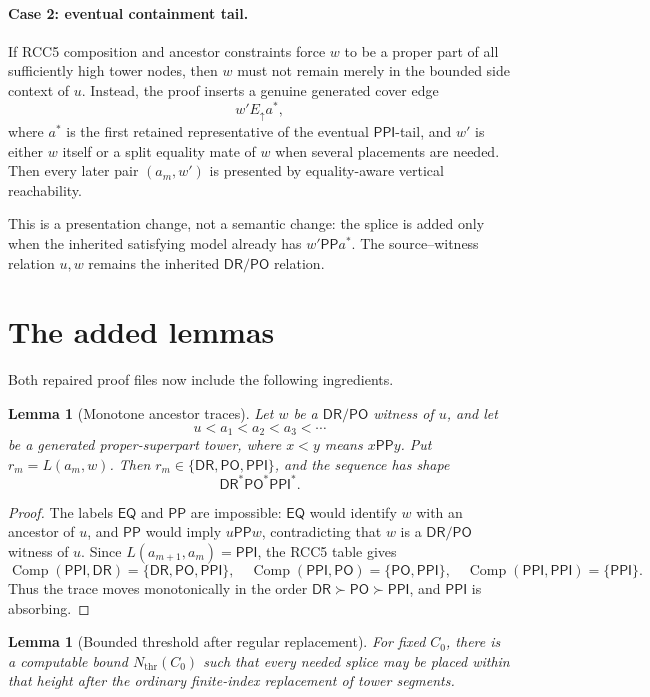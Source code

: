 \documentclass[11pt]{article}
\newtheorem{lemma}[theorem]{Lemma}
\newcommand{\EQ}{\mathsf{EQ}}
\newcommand{\DR}{\mathsf{DR}}
\newcommand{\PO}{\mathsf{PO}}
\newcommand{\PP}{\mathsf{PP}}
\newcommand{\PPI}{\mathsf{PPI}}
\newcommand{\comp}{\operatorname{Comp}}
\begin{document}
\paragraph{Case 2: eventual containment tail.}
If RCC5 composition and ancestor constraints force \(w\) to be a proper part of all sufficiently high tower nodes, then \(w\) must not remain merely in the bounded side context of \(u\).  Instead, the proof inserts a genuine generated cover edge
\[
   w' E_{\uparrow} a^*,
\]
where \(a^*\) is the first retained representative of the eventual \(\PPI\)-tail, and \(w'\) is either \(w\) itself or a split equality mate of \(w\) when several placements are needed.  Then every later pair \((a_m,w')\) is presented by equality-aware vertical reachability.

This is a presentation change, not a semantic change: the splice is added only when the inherited satisfying model already has \(w'\PP a^*\).  The source--witness relation \(u,w\) remains the inherited \(\DR/\PO\) relation.

\section{The added lemmas}

Both repaired proof files now include the following ingredients.

\begin{lemma}[Monotone ancestor traces]
Let \(w\) be a \(\DR/\PO\) witness of \(u\), and let
\[
   u<a_1<a_2<a_3<\cdots
\]
be a generated proper-superpart tower, where \(x<y\) means \(x\PP y\).  Put \(r_m=L(a_m,w)\).  Then \(r_m\in\{\DR,\PO,\PPI\}\), and the sequence has shape
\[
   \DR^*\PO^*\PPI^*.
\]
\end{lemma}

\begin{proof}
The labels \(\EQ\) and \(\PP\) are impossible: \(\EQ\) would identify \(w\) with an ancestor of \(u\), and \(\PP\) would imply \(u\PP w\), contradicting that \(w\) is a \(\DR/\PO\) witness of \(u\).  Since \(L(a_{m+1},a_m)=\PPI\), the RCC5 table gives
\[
\comp(\PPI,\DR)=\{\DR,\PO,\PPI\},\quad
\comp(\PPI,\PO)=\{\PO,\PPI\},\quad
\comp(\PPI,\PPI)=\{\PPI\}.
\]
Thus the trace moves monotonically in the order \(\DR\succ\PO\succ\PPI\), and \(\PPI\) is absorbing.
\end{proof}

\begin{lemma}[Bounded threshold after regular replacement]
For fixed \(C_0\), there is a computable bound \(N_{\mathrm{thr}}(C_0)\) such that every needed splice may be placed within that height after the ordinary finite-index replacement of tower segments.
\end{lemma}
\end{document}
